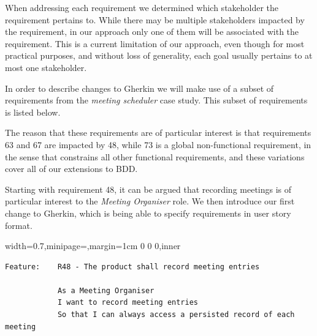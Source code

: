 \documentclass[dissertation,final]{softeng}
\newenvironment{featurecode}[1]
{ \lrbox\featurebox \begin{adjustbox}{width=#1\textwidth,minipage=\textwidth,margin=1cm 0 0 0,inner} }
{ \end{adjustbox}\endlrbox}
\newenvironment{featurelist}[2]
{
\newcommand{\setcaption}{\caption{#1}}
\newcommand{\setlabel}{\label{#2}}
}
{\begin{listing}[h!]\centering\usebox\featurebox\setcaption\setlabel\end{listing}}
\begin{document}
When addressing each requirement we determined which stakeholder the requirement pertains to. While there may be multiple stakeholders impacted by the requirement, in our approach only one of them will be associated with the requirement. This is a current limitation of our approach, even though for most practical purposes, and without loss of generality, each goal usually pertains to at most one stakeholder.
 
In order to describe changes to Gherkin we will make use of a subset of requirements from the \emph{meeting scheduler} case study. This subset of requirements is listed below.

\begin{table}[h!]
\caption[Exemplar subset of meeting scheduler requirements]{Exemplar subset of meeting scheduler requirements}
\label{tb:case_study_reqs_for_analysis}
\setlength{\extrarowheight}{1.8pt}
\centering
{}
\end{table}

The reason that these requirements are of particular interest is that requirements 63 and 67 are impacted by 48, while 73 is a global non-functional requirement, in the sense that constrains all other functional requirements, and these variations cover all of our extensions to BDD.

Starting with requirement 48, it can be argued that recording meetings is of particular interest to the \emph{Meeting Organiser} role. We then introduce our first change to Gherkin, which is being able to specify requirements in user story format.

\begin{featurelist}{Changes to Gherkin -- User story format}{lst:gherkin_changes_userstory}
\begin{featurecode}{0.7}
\begin{verbatim}
Feature:    R48 - The product shall record meeting entries

            As a Meeting Organiser
            I want to record meeting entries
            So that I can always access a persisted record of each meeting
\end{verbatim}
\end{featurecode}
\end{featurelist}
\end{document}
